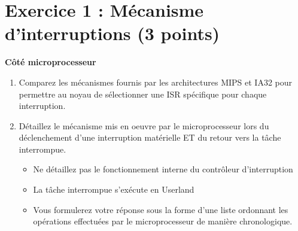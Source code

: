 \section*{Exercice 1 : M\'ecanisme d'interruptions (3 points)}

{\bf C\^ot\'e microprocesseur}

\begin{enumerate}
\item Comparez les m\'ecanismes fournis par les architectures MIPS et IA32 pour permettre au noyau de s\'electionner une ISR sp\'ecifique pour chaque interruption.
\item D\'etaillez le m\'ecanisme mis en oeuvre par le microprocesseur lors du d\'eclenchement d'une interruption mat\'erielle ET du retour vers la t\^ache interrompue.

\begin{itemize}
\item Ne d\'etaillez pas le fonctionnement interne du contr\^oleur d'interruption
\item La t\^ache interrompue s'ex\'ecute en Userland
\item Vous formulerez votre r\'eponse sous la forme d'une liste ordonnant les op\'erations effectu\'ees par le microprocesseur de mani\`ere chronologique.
\end{itemize}

\end{enumerate}


